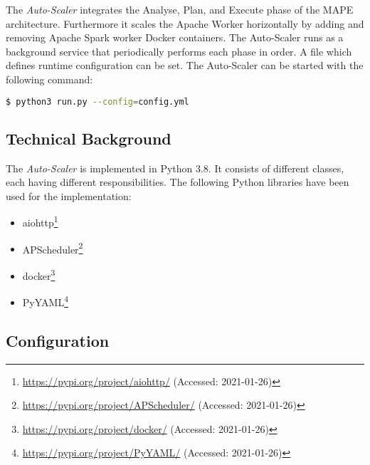 The \textit{Auto-Scaler} integrates the Analyse, Plan, and Execute phase of the MAPE architecture. Furthermore it scales the Apache Worker horizontally by adding and removing Apache Spark worker Docker containers.
The Auto-Scaler runs as a background service that periodically performs each phase in order.
A file which defines runtime configuration can be set.
The Auto-Scaler can be started with the following command:
\begin{lstlisting}[label=lst:06_auto-scaler_start, caption=Auto-Scaler start command, language=sh, numbers=none]
$ python3 run.py --config=config.yml
\end{lstlisting}


\subsection{Technical Background}
The \textit{Auto-Scaler} is implemented in Python 3.8. It consists of different classes, each having different responsibilities.
The following Python libraries have been used for the implementation:
\begin{itemize}
\item aiohttp\footnote{\url{https://pypi.org/project/aiohttp/} (Accessed: 2021-01-26)}
\item APScheduler\footnote{\url{https://pypi.org/project/APScheduler/} (Accessed: 2021-01-26)}
\item docker\footnote{\url{https://pypi.org/project/docker/} (Accessed: 2021-01-26)}
\item PyYAML\footnote{\url{https://pypi.org/project/PyYAML/} (Accessed: 2021-01-26)}
\end{itemize}


\subsection{Configuration}
